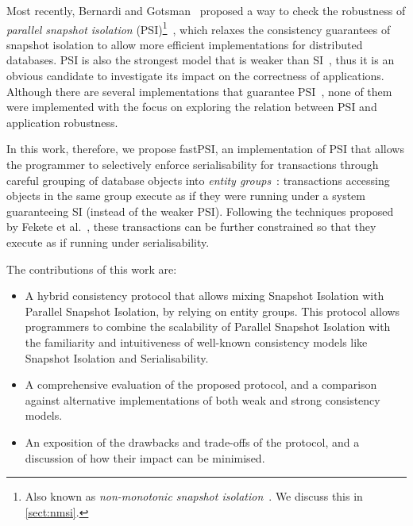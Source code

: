Most recently, Bernardi and Gotsman~\citep{concur_robustness} proposed a way to check the robustness of \emph{parallel snapshot isolation} (PSI)\footnote{Also known as \emph{non-monotonic snapshot isolation}~\citep{ardekani_nmsi}. We discuss this in \textsection\ref{sect:nmsi}.}~\citep{psi-intro}, which relaxes the consistency guarantees of snapshot isolation to allow more efficient implementations for distributed databases. PSI is also the strongest model that is weaker than SI~\citep{concur_framework}, thus it is an obvious candidate to investigate its impact on the correctness of applications. Although there are several implementations that guarantee PSI~\citep{psi-intro, ardekani_nmsi, moniz_blotter}, none of them were implemented with the focus on exploring the relation between PSI and application robustness.

In this work, therefore, we propose fastPSI, an implementation of PSI that allows the programmer to selectively enforce serialisability for transactions through careful grouping of database objects into \emph{entity groups}~\citep{baker_megastore}: transactions accessing objects in the same group execute as if they were running under a system guaranteeing SI (instead of the weaker PSI). Following the techniques proposed by Fekete et al.~\citep{fekete_ssi}, these transactions can be further constrained so that they execute as if running under serialisability.

\pagebreak

The contributions of this work are:

\begin{itemize}
    \item A hybrid consistency protocol that allows mixing Snapshot Isolation with Parallel Snapshot Isolation, by relying on entity groups. This protocol allows programmers to combine the scalability of Parallel Snapshot Isolation with the familiarity and intuitiveness of well-known consistency models like Snapshot Isolation and Serialisability.
    \item A comprehensive evaluation of the proposed protocol, and a comparison against alternative implementations of both weak and strong consistency models.
    \item An exposition of the drawbacks and trade-offs of the protocol, and a discussion of how their impact can be minimised.
\end{itemize}


